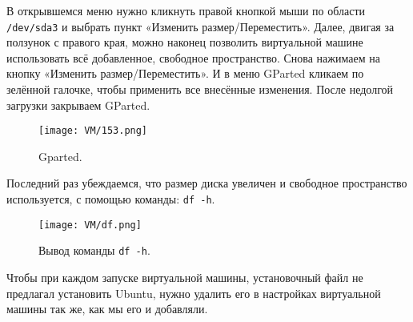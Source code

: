 В открывшемся меню нужно кликнуть правой кнопкой мыши по области \texttt{/dev/sda3} и выбрать пункт «Изменить размер/Переместить». Далее, двигая за ползунок с правого края, можно наконец позволить виртуальной машине использовать всё добавленное, свободное пространство. Снова нажимаем на кнопку «Изменить размер/Переместить». И в меню GParted  кликаем по зелённой галочке, чтобы применить все внесённые изменения. После недолгой загрузки закрываем GParted.

\begin{figure}[h]
		\centering
		\texttt{[image: VM/153.png]}
\caption{Gparted.}
\label{ris:image}
\end{figure}

Последний раз убеждаемся, что размер диска увеличен и свободное пространство используется, с помощью команды: \texttt{df -h}.

\begin{figure}[h]
		\centering
		\texttt{[image: VM/df.png]}
\caption{Вывод команды \texttt{df -h}.}
\label{ris:image}
\end{figure}

Чтобы при каждом запуске виртуальной машины, установочный файл не предлагал установить Ubuntu, нужно удалить его в настройках виртуальной машины так же, как мы его и добавляли.